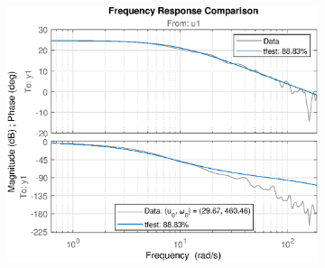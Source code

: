 \begin{figure}[H]
\begin{minipage}{0.32\textwidth}
\begin{figure}[H]
       \end{figure}
    \end{minipage}
    \begin{minipage}{0.32\textwidth}
       \begin{figure}[H]
            \includegraphics[width = \textwidth]{./figs/small_perturbation/freq_Compare_1350.eps}
       \end{figure}
    \end{minipage}
\end{figure}
